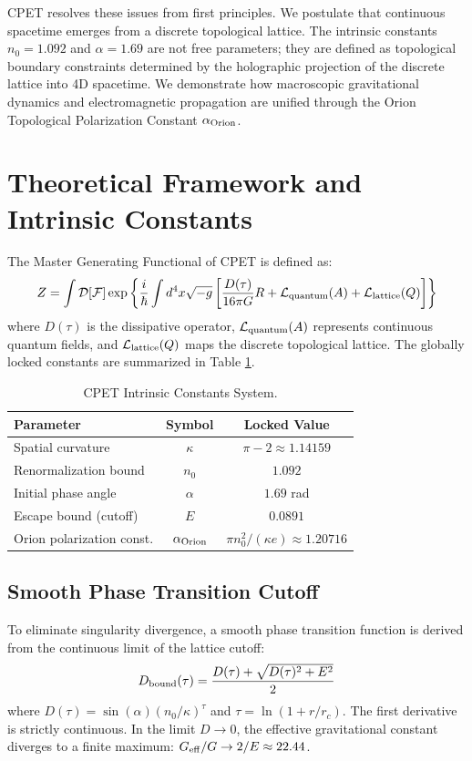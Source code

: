 \documentclass[twocolumn,aps,prd,superscriptaddress,nofootinbib]{revtex4-2}
\begin{document}
CPET resolves these issues from first principles. We postulate that continuous spacetime emerges from a discrete topological lattice. The intrinsic constants \(n_0 = 1.092\) and \(\alpha = 1.69\) are not free parameters; they are defined as topological boundary constraints determined by the holographic projection of the discrete lattice into 4D spacetime. We demonstrate how macroscopic gravitational dynamics and electromagnetic propagation are unified through the Orion Topological Polarization Constant \(\alpha_{\rm Orion}\).

\section{Theoretical Framework and Intrinsic Constants}
The Master Generating Functional of CPET is defined as:
\begin{equation}
Z = \int \mathcal{D}[\mathcal{F}] \exp\left\{ \frac{i}{\hbar} \int d^4x \sqrt{-g} \left[ \frac{D(\tau)}{16\pi G} R + \mathcal{L}_{\rm quantum}(A) + \mathcal{L}_{\rm lattice}(Q) \right] \right\}
\end{equation}
where \(D(\tau)\) is the dissipative operator, \(\mathcal{L}_{\rm quantum}(A)\) represents continuous quantum fields, and \(\mathcal{L}_{\rm lattice}(Q)\) maps the discrete topological lattice. The globally locked constants are summarized in Table \ref{tab:constants}.

\begin{table}[h]
\centering
\caption{CPET Intrinsic Constants System.}
\label{tab:constants}
\begin{tabular}{lcc}
\hline\hline
Parameter & Symbol & Locked Value \\
\hline
Spatial curvature & \(\kappa\) & \(\pi - 2 \approx 1.14159\) \\
Renormalization bound & \(n_0\) & \(1.092\) \\
Initial phase angle & \(\alpha\) & \(1.69\) rad \\
Escape bound (cutoff) & \(E\) & \(0.0891\) \\
Orion polarization const. & \(\alpha_{\rm Orion}\) & \(\pi n_0^2/(\kappa e) \approx 1.20716\) \\
\hline\hline
\end{tabular}
\end{table}

\subsection{Smooth Phase Transition Cutoff}
To eliminate singularity divergence, a smooth phase transition function is derived from the continuous limit of the lattice cutoff:
\begin{equation}
D_{\rm bound}(\tau) = \frac{D(\tau) + \sqrt{D(\tau)^2 + E^2}}{2}
\end{equation}
where \(D(\tau) = \sin(\alpha) (n_0/\kappa)^\tau\) and \(\tau = \ln(1 + r/r_c)\). The first derivative is strictly continuous. In the limit \(D \to 0\), the effective gravitational constant diverges to a finite maximum: \(G_{\rm eff}/G \to 2/E \approx 22.44\).
\end{document}
